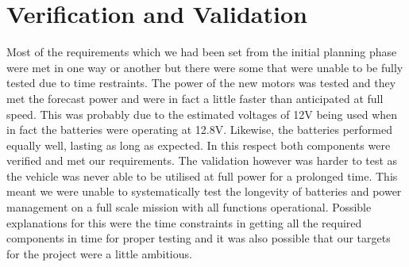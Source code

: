\section{Verification and Validation}
Most of the requirements which we had been set from the initial planning phase were met in one way or another but there were some that were unable to be fully tested due to time restraints.  
The power of the new motors was tested and they met the forecast power and were in fact a little faster than anticipated at full speed.  This was probably due to the estimated voltages of 12V being used when in fact the batteries were operating at 12.8V.  Likewise, the batteries performed equally well, lasting as long as expected.
In this respect both components were verified and met our requirements.  
\newline
The validation however was harder to test as the vehicle was never able to be utilised at full power for a prolonged time.  This meant we were unable to systematically test the longevity of batteries and power management on a full scale mission with all functions operational.  Possible explanations for this were the time constraints in getting all the required components in time for proper testing and it was also possible that our targets for the project were a little ambitious.  